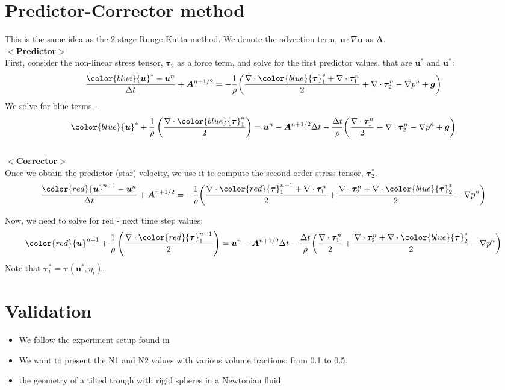 \section{Predictor-Corrector method}
This is the same idea as the 2-stage Runge-Kutta method. We denote the advection term, ${\bm u} \cdot \nabla {\bm u}$ as ${\bm A}$. 
\\
$<${\bf Predictor}$>$
\\
First, consider the non-linear stress tensor, ${\bm \tau_2}$ as a force term, and solve for the first predictor values, that are ${\bm u}^*$ and ${\bm u}^*$:
\[
\frac{{\color{blue}{\bm u}^*} - {\bm u}^n}{\Delta t} 
+  {\bm A}^{n+1/2} 
=- \frac{1}{\rho}  \biggl(
\frac{\nabla \cdot {\color{blue}{\bm \tau}_1^*} + \nabla \cdot{\bm \tau}_1^n}{2} 
+ \nabla \cdot {\bm \tau}_2^n 
- \nabla p^n
+{\bm g}
\biggr)
\]
We solve for blue terms - 
\[
{\color{blue}{\bm u}^*} +
\frac{1}{\rho} 
\left( 
\frac{\nabla \cdot {\color{blue}{\bm \tau}_1^*}}{2}
\right)
=
{\bm u}^n
- {\bm A}^{n+1/2} \Delta t
- \frac{\Delta t}{\rho} \biggl(
\frac{ \nabla \cdot{\bm \tau}_1^n}{2} 
+ \nabla \cdot {\bm \tau}_2^n 
- \nabla p^n
+{\bm g}
\biggr)
\]
\\
$<${\bf Corrector}$>$
\\
Once we obtain the predictor (star) velocity, we use it to compute the second order stress tensor, ${\bm \tau}_2^*$.
\[
\frac{{\color{red}{\bm u}^{n+1}} - {\bm u}^n}{\Delta t} 
+  {\bm A}^{n+1/2} 
=- \frac{1}{\rho}  \biggl(
\frac{\nabla \cdot {\color{red}{\bm \tau}_1^{n+1}} + \nabla \cdot{\bm \tau}_1^n}{2} 
+ \frac{\nabla \cdot {\bm \tau}_2^{n} + \nabla \cdot {\color{blue}{\bm \tau}_2^*}}{2} 
- \nabla p^n
\biggr)
\]

Now, we need to solve for red - next time step values:
\[
{\color{red}{\bm u}^{n+1}} 
+\frac{1}{\rho} 
\left(
\frac{\nabla \cdot {\color{red}{\bm \tau}_1^{n+1}}}{2}
\right)
=
{\bm u}^n 
 -{\bm A}^{n+1/2} \Delta t
- \frac{\Delta t}{\rho}  \biggl(
\frac{ \nabla \cdot{\bm \tau}_1^n}{2} 
+ \frac{\nabla \cdot {\bm \tau}_2^{n} + \nabla \cdot {\color{blue}{\bm \tau}_2^*}}{2} 
- \nabla p^n
\biggr)
\]
Note that ${\bm \tau}_i^* = {\bm \tau}({\bm u}^*, \eta_i)$.
\section{Validation}
\begin{itemize}
  \item We follow the experiment setup found in \cite{couturier_suspensions_2011}
  \item We want to present the N1 and N2 values with various volume fractions: from 0.1 to 0.5.
  \item the geometry of a tilted trough with rigid spheres in a Newtonian fluid. 
\end{itemize}
